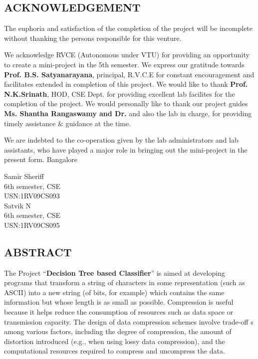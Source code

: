 \documentclass[12pt]{report}
\begin{document}
  
\setcounter{page}{1}
\begin{center}
\section*{ACKNOWLEDGEMENT}
\end{center}
The euphoria and satisfaction of the completion of the project will be incomplete
without thanking the persons responsible for this venture.


We acknowledge RVCE (Autonomous under VTU) for providing an opportunity to
create a mini-project in the 5th semester. We express our gratitude towards \textbf{Prof. B.S. Satyanarayana}, principal, R.V.C.E for constant encouragement and facilitates extended in completion of this project. We would like to thank \textbf{Prof. N.K.Srinath}, HOD, CSE
Dept. for providing excellent lab facilites for the completion of the project. We would
personally like to thank our project guides \textbf{Ms. Shantha Rangaswamy and Dr. } and also the lab in charge, for providing timely assistance \& guidance at the time.



We are indebted to the co-operation given by the lab administrators and lab assistants,
who have played a major role in bringing out the mini-project in the present form.
Bangalore



\begin{flushright}
Samir Sheriff\\
6th semester, CSE\\
USN:1RV09CS093\\

Satvik N\\
6th semester, CSE\\
USN:1RV09CS095\\

\end{flushright}

\newpage

\begin{center}
\section*{ABSTRACT}
\end{center} 
The Project ``\textbf{Decision Tree based Classifier}” is aimed at developing programs that transform a string of characters in some representation (such as ASCII) into a new string (of bits, for example) which contains the same information but whose length is as small as possible.  Compression is useful because it helps reduce the consumption of resources such as data space or transmission capacity. The design of data compression schemes involve trade-off s among various factors, including the degree of compression, the amount of distortion introduced (e.g., when using lossy data compression), and the computational resources required to compress and uncompress the data.
 
\end{document}
